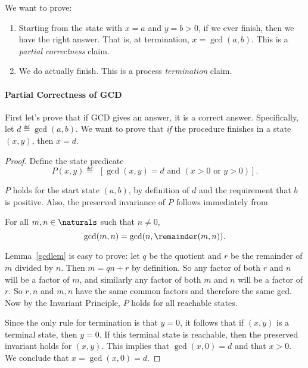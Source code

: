 We want to prove:
\begin{enumerate}
\item Starting from the state with $x = a$ and $y = b>0$, if we ever finish,
then we have the right answer.  That is, at termination, $x = \gcd(a,b)$.
This is a \emph{partial correctness} claim.

\item We do actually finish.  This is a process \emph{termination} claim.

\end{enumerate}

\paragraph{Partial Correctness of GCD}

First let's prove that if GCD gives an answer, it is a correct answer.
Specifically, let $d \eqdef \gcd(a,b)$.  We want to prove that \emph{if}
the procedure finishes in a state $(x,y)$, then $x = d$.

\begin{proof}
Define the state predicate
\[
P(x,y) \eqdef\ \ [\gcd(x,y) = d \text{ and } (x > 0 \text{ or } y > 0)].
\]

$P$ holds for the start state $(a,b)$, by definition of $d$ and the
requirement that $b$ is positive.  Also, the preserved invariance of
$P$ follows immediately from
\begin{lemma}\label{gcdlem}
For all $m,n \in \naturals$ such that $n \neq 0$,
\begin{equation}
\gcd(m,n) = \gcd(n,\remainder(m,n)).
\end{equation}
\end{lemma}

Lemma~\ref{gcdlem} is easy to prove: let $q$ be the quotient and $r$
be the remainder of $m$ divided by $n$.  Then $m = qn +r$ by
definition.  So any factor of both $r$ and $n$ will be a factor of
$m$, and similarly any factor of both $m$ and $n$ will be a factor of
$r$.  So $r,n$ and $m,n$ have the same common factors and therefore
the same gcd.  Now by the Invariant Principle, $P$ holds for all
reachable states.

Since the only rule for termination is that $y=0$, it follows that if
$(x,y)$ is a terminal state, then $y=0$.  If this terminal state is
reachable, then the preserved invariant holds for $(x,y)$.  This implies
that $\gcd(x,0) = d$ and that $x>0$.  We conclude that $x = \gcd(x,0) =
d$.
\end{proof}

